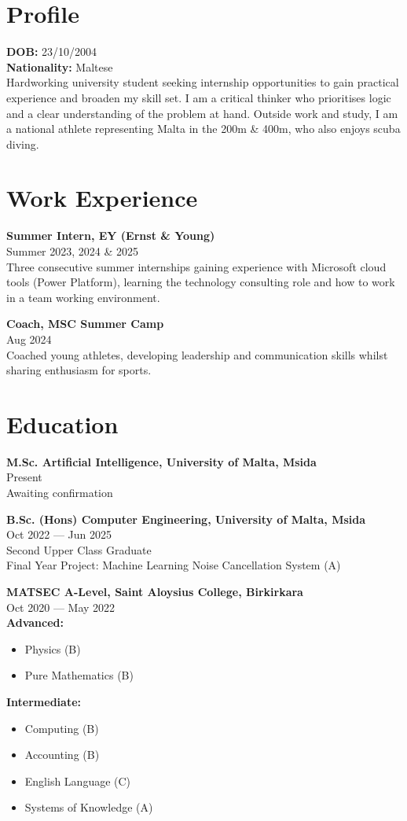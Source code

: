 \documentclass[11pt,a4paper]{article}
\newcommand{\entry}[3]{%
  \noindent\textbf{#1}\\[-1pt]
  \textcolor{muted}{#2}\\
  \color{text}#3\par\vspace{0.6em}}
\begin{document}
\vspace*{4.5cm}
\color{text}

\color{text}

\section*{Profile}
\textbf{DOB:} 23/10/2004\\
\textbf{Nationality:} Maltese\\

\noindent
Hardworking university student seeking internship opportunities to gain practical experience and broaden my skill set. I am a critical thinker who prioritises logic and a clear understanding of the problem at hand. Outside work and study, I am a national athlete representing Malta in the 200m \& 400m, who also enjoys scuba diving.

\section*{Work Experience}
\entry{Summer Intern, EY (Ernst \& Young)}{Summer 2023, 2024 \& 2025}{Three consecutive summer internships gaining experience with Microsoft cloud tools (Power Platform), learning the technology consulting role and how to work in a team working environment.}

\entry{Coach, MSC Summer Camp}{Aug 2024}{Coached young athletes, developing leadership and communication skills whilst sharing enthusiasm for sports.}

\section*{Education}
\entry{M.Sc. Artificial Intelligence, University of Malta, Msida}{Present}{Awaiting confirmation}

\entry{B.Sc. (Hons) Computer Engineering, University of Malta, Msida}{Oct 2022 — Jun 2025}{Second Upper Class Graduate\\ Final Year Project: Machine Learning Noise Cancellation
System (A)}
\pagebreak
\vspace*{2em}

\entry{MATSEC A-Level, Saint Aloysius College, Birkirkara}{Oct 2020 — May 2022}{\textbf{Advanced:}
\begin{itemize}
  \item Physics (B)
  \item Pure Mathematics (B)
\end{itemize}
\textbf{Intermediate:}
\begin{itemize}
  \item Computing (B)
  \item Accounting (B)
  \item English Language (C)
  \item Systems of Knowledge (A)
\end{itemize}}
\end{document}
